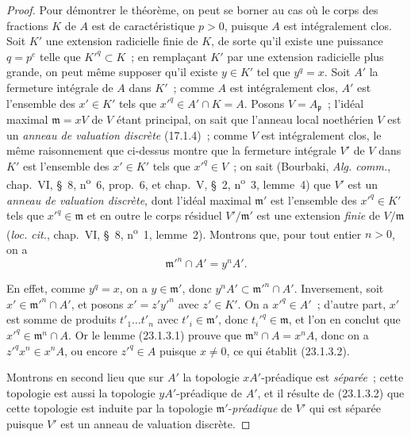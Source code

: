 \begin{proof}
Pour démontrer le théorème, on peut se borner au cas où le corps des fractions
$K$ de $A$ est de caractéristique $p>0$, puisque $A$ est intégralement clos.
Soit $K'$ une extension radicielle finie de $K$, de sorte qu'il existe une
puissance $q=p^e$ telle que $K'^q\subset K$~; en remplaçant $K'$ par une
extension radicielle plus grande, on peut même supposer qu'il existe $y\in K'$
tel que $y^q=x$. Soit $A'$ la fermeture intégrale de $A$ dans $K'$~; comme
$A$ est intégralement clos, $A'$ est l'ensemble des $x'\in K'$ tels que
$x'^q\in A'\cap K=A$. Posons $V=A_{\mathfrak p}$~; l'idéal maximal
$\mathfrak m=xV$ de $V$ étant principal, on sait que l'anneau local
noethérien $V$ est un \emph{anneau de valuation discrète} (17.1.4)~; comme
$V$ est intégralement clos, le même
raisonnement que ci-dessus montre que la fermeture intégrale $V'$ de $V$ dans
$K'$ est l'ensemble des $x'\in K'$ tels que $x'^q\in V$~; on sait
(Bourbaki, \emph{Alg. comm.}, chap.~VI, §~8, n\textsuperscript{o}~6,
prop.~6, et chap.~V, §~2, n\textsuperscript{o}~3, lemme~4) que $V'$ est un
\emph{anneau de valuation discrète}, dont l'idéal maximal $\mathfrak m'$ est
l'ensemble des $x'^q\in K'$ tels que $x'^q\in\mathfrak m$ et en outre le corps
résiduel $V'/\mathfrak m'$ est une extension \emph{finie} de
$V/\mathfrak m$ (\emph{loc. cit.}, chap.~VI, §~8,
n\textsuperscript{o}~1, lemme~2). Montrons que, pour tout entier $n>0$, on a
\begin{equation}
\label{0.23.1.3.2-fr}
  \mathfrak m'^n\cap A'=y^nA'.
  \tag{23.1.3.2}
\end{equation}

En effet, comme $y^q=x$, on a $y\in\mathfrak m'$, donc
$y^nA'\subset\mathfrak m'^n\cap A'$. Inversement, soit
$x'\in\mathfrak m'^n\cap A'$, et posons $x'=z'y'^n$ avec $z'\in K'$. On a
$x'^q\in A'$~; d'autre part, $x'$ est somme de produits
$t'_1\ldots t'_n$ avec $t'_i\in\mathfrak m'$, donc
$t_i'^q\in\mathfrak m$, et l'on en conclut que
$x'^q\in\mathfrak m^n\cap A$. Or le lemme (23.1.3.1) prouve que
$\mathfrak m^n\cap A=x^nA$, donc on a $z'^qx^n\in x^nA$, ou encore
$z'^q\in A$ puisque $x\neq0$, ce qui établit (23.1.3.2).

Montrons en second lieu que sur $A'$ la topologie $xA'$-préadique est
\emph{séparée}~; cette topologie est aussi la topologie $yA'$-préadique de
$A'$, et il résulte de (23.1.3.2) que cette topologie est induite par la
topologie $\mathfrak m'$-\emph{préadique} de $V'$ qui est séparée puisque $V'$ est
un anneau de valuation discrète.


\end{proof}
